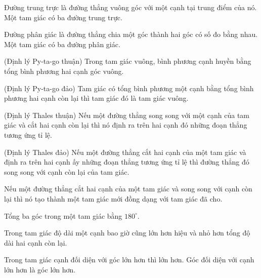 \begin{dn}
	Đường trung trực là  đường thẳng vuông góc với một cạnh tại trung điểm của nó. Một tam giác có ba đường trung trực.
\end{dn}

\begin{dn}
	Đường phân giác là đường thẳng chia một góc thành hai góc có số đo bằng nhau. Một tam giác có ba đường phân giác.
\end{dn}

\begin{dl}
	(Định lý Py-ta-go thuận) Trong tam giác vuông, bình phương cạnh huyền bằng tổng bình phương hai cạnh góc vuông.
\end{dl}

\begin{dl}
	(Định lý Py-ta-go đảo) Tam giác có tổng bình phương một cạnh bằng tổng bình phương hai cạnh còn lại thì tam giác đó là tam giác vuông.
\end{dl}

\begin{dl}
	(Định lý Thales thuận) Nếu một đường thẳng song song với một cạnh của tam giác và cắt hai cạnh còn lại thì nó định ra trên hai cạnh đó những đoạn thẳng tương ứng tỉ lệ. 
\end{dl}

\begin{dl}
	(Định lý Thales đảo) Nếu một đường thẳng cắt hai cạnh của một tam giác và định ra trên hai cạnh ấy những đoạn thẳng tương ứng tỉ lệ thì đường thẳng đó song song với cạnh còn lại của tam giác.
\end{dl}

\begin{hq}
	Nếu một đường thẳng cắt hai cạnh của một tam giác và song song với cạnh còn lại thì nó tạo thành một tam giác mới đồng dạng với tam giác đã cho.
\end{hq}

\begin{tc}
	Tổng ba góc trong một tam giác bằng $180^\circ.$
\end{tc}

\begin{tc}
	Trong tam giác độ dài một cạnh bao giờ cũng lớn hơn hiệu và nhỏ hơn tổng độ dài hai cạnh còn lại.
\end{tc}

\begin{tc}
	Trong tam giác cạnh đối diện với góc lớn hơn thì lớn hơn. Góc đối diện với cạnh lớn hơn là góc lớn hơn.
\end{tc}

